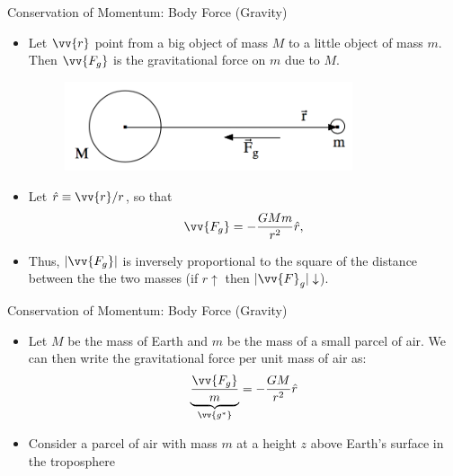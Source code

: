 \begin{frame}{Conservation of Momentum: Body Force (Gravity)}
\begin{itemize}
	\item Let $\vv{r}$ point from a big object of mass $M$ to a little object of mass $m$. Then $\vv{F_g}$ is the gravitational force on $m$ due to $M$.
	\begin{figure}
		\includegraphics[width=0.8\textwidth]{gravity}	
	\end{figure}
	\item Let $\hat{r} \equiv \vv{r}/r$, so that $$\vv{F_g} = -\frac{GMm}{r^2}\hat{r},$$
	\item Thus, $|\vv{F_g}|$ is inversely proportional to the square of the distance between the the two masses (if $r\uparrow$ then $|\vv{F}_g|\downarrow$).
\end{itemize}
\end{frame}
\begin{frame}{Conservation of Momentum: Body Force (Gravity)}
\begin{itemize}
	\item Let $M$ be the mass of Earth and $m$ be the mass of a small parcel of air. We can then write the gravitational force per unit mass of air as:
	$$\underbrace{\frac{\vv{F_g}}{m}}_{\vv{g^*}}  = -\frac{GM}{r^2}\hat{r}$$
	\item Consider a parcel of air with mass $m$ at a height $z$ above Earth's surface in the troposphere
\end{itemize}
\end{frame}

